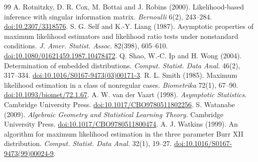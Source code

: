 \documentclass[11pt]{article}
\newcommand{\doi}[1]{\href{https://doi.org/#1}{doi:#1}}
\theoremstyle{definition}
\theoremstyle{remark}
\begin{document}
\begin{thebibliography}{99}
 A. Rotnitzky, D. R. Cox, M. Bottai and J. Robins (2000).
Likelihood-based inference with singular information matrix.
\emph{Bernoulli} 6(2), 243--284. \doi{10.2307/3318576}.
 S. G. Self and K.-Y. Liang (1987).
Asymptotic properties of maximum likelihood estimators and likelihood ratio
tests under nonstandard conditions.
\emph{J. Amer. Statist. Assoc.} 82(398), 605--610.
\doi{10.1080/01621459.1987.10478472}.
 Q. Shao, W.-C. Ip and H. Wong (2004).
Determination of embedded distributions. \emph{Comput. Statist. Data Anal.}
46(2), 317--334. \doi{10.1016/S0167-9473(03)00171-3}.
 R. L. Smith (1985).
Maximum likelihood estimation in a class of nonregular cases.
\emph{Biometrika} 72(1), 67--90. \doi{10.1093/biomet/72.1.67}.
 A. W. van der Vaart (1998). \emph{Asymptotic Statistics}.
Cambridge University Press. \doi{10.1017/CBO9780511802256}.
 S. Watanabe (2009).
\emph{Algebraic Geometry and Statistical Learning Theory}.
Cambridge University Press. \doi{10.1017/CBO9780511800474}.
 A. J. Watkins (1999).
An algorithm for maximum likelihood estimation in the three parameter Burr XII
distribution. \emph{Comput. Statist. Data Anal.} 32(1), 19--27.
\doi{10.1016/S0167-9473(99)00024-9}.
\end{thebibliography}
\end{document}
